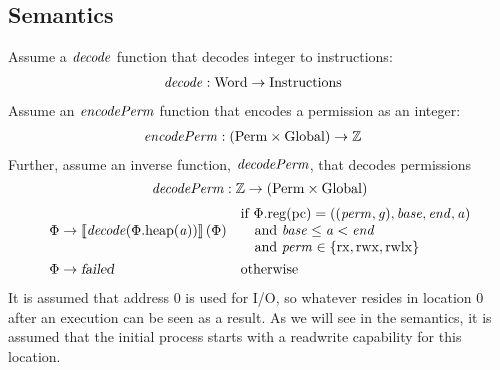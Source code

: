 \documentclass[a4paper]{article}
\newcommand{\sem}[1]{\left\llbracket #1 \right\rrbracket}
\newcommand{\fun}{\rightarrow}
\newcommand{\var}[1]{\mathit{#1}}
\newcommand{\gl}{\var{g}}
\newcommand{\pcreg}{\mathrm{pc}}
\newcommand{\addr}{\var{a}}
\newcommand{\start}{\var{base}}
\newcommand{\addrend}{\var{end}}
\newcommand{\perm}{\var{perm}}
\newcommand{\stdcap}[1][(\perm,\gl)]{\left(#1,\start,\addrend,\addr \right)}
\newcommand{\plainproj}[1]{\mathrm{#1}}
\newcommand{\memheap}[1][\Phi]{#1.\plainproj{heap}}
\newcommand{\memreg}[1][\Phi]{#1.\plainproj{reg}}
\newcommand{\failed}{\textsl{failed}}
\newcommand{\plainfun}[2]{
  \ifthenelse{\equal{#2}{}}
             {\mathit{#1}}
             {\mathit{#1}(#2)}
}
\newcommand{\decode}{\plainfun{decode}{}}
\newcommand{\encodePerm}{\plainfun{encodePerm}{}}
\newcommand{\decodePerm}{\plainfun{decodePerm}{}}
\newcommand{\plaindom}[1]{\mathrm{#1}}
\newcommand{\Words}{\plaindom{Word}}
\newcommand{\Instrs}{\plaindom{Instructions}}
\newcommand{\ints}{\mathbb{Z}}
\newcommand{\Perms}{\plaindom{Perm}}
\newcommand{\Globals}{\plaindom{Global}}
\newcommand{\plainperm}[1]{\mathrm{#1}}
\newcommand{\exec}{\plainperm{rx}}
\newcommand{\rwx}{\plainperm{rwx}}
\newcommand{\rwlx}{\plainperm{rwlx}}
\begin{document}
\subsection*{Semantics}
Assume a $\decode$ function that decodes integer to instructions:
\begin{align*}
\decode &:\Words \fun \Instrs
\end{align*}
Assume an $\encodePerm$ function that encodes a permission as an integer:
\begin{align*}
\encodePerm &: (\Perms \times \Globals) \fun \ints
\end{align*}
Further, assume an inverse function, $\decodePerm$, that decodes permissions
\[
  \decodePerm : \ints \fun (\Perms \times \Globals)
\]
\begin{align*}
  \Phi & \rightarrow \sem{\decode(\memheap(\addr))}(\Phi) & &                                   
                                                              \arraycolsep=0pt
                                                              \begin{array}{l}
                                                                \text{if $\memreg(\pcreg) = \stdcap$}\\
                                                                \quad\text{and $\start \leq \addr < \addrend$}\\
                                                                \quad\text{and $\perm \in \{ \exec,\rwx, \rwlx \}$ }
                                                              \end{array}\\
\Phi & \rightarrow \failed                                 & & \text{otherwise}
\end{align*}
It is assumed that address 0 is used for I/O, so whatever resides in location 0 after an execution can be seen as a result. As we will see in the semantics, it is assumed that the initial process starts with a readwrite capability for this location.
\end{document}
